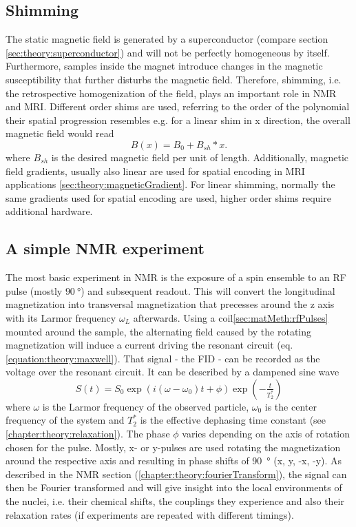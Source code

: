         \subsection{Shimming}
        The static magnetic field is generated by a superconductor (compare section \ref{sec:theory:superconductor}) and will not be perfectly homogeneous by itself. Furthermore, samples inside the magnet introduce changes in the magnetic susceptibility that further disturbs the magnetic field. Therefore, shimming, i.e. the retrospective homogenization of the field, plays an important role in NMR and MRI. Different order shims are used, referring to the order of the polynomial their spatial progression resembles e.g. for a linear shim in x direction, the overall magnetic field would read
            \begin{equation}
                B(x) = B_0 + B_{sh} * x.
            \end{equation}
            where $B_{sh}$ is the desired magnetic field per unit of length.
            Additionally, magnetic field gradients, usually also linear are used for spatial encoding in MRI applications \ref{sec:theory:magneticGradient}. For linear shimming, normally the same gradients used for spatial encoding are used, higher order shims require additional hardware.
        \subsection{A simple NMR experiment}
        The most basic experiment in NMR is the exposure of a spin ensemble to an RF pulse (mostly $\SI{90}{\degree}$) and subsequent readout. This will convert the longitudinal magnetization into transversal magnetization that precesses around the z axis with its Larmor frequency $\omega_L$ afterwards. Using a coil\ref{sec:matMeth:rfPulses} mounted around the sample, the alternating field caused by the rotating magnetization will induce a current driving the resonant circuit (eq. \ref{equation:theory:maxwell}). That signal - the FID - can be recorded as the voltage over the resonant circuit. It can be described by a dampened sine wave
            \begin{equation}
                S(t) = S_0 \exp(i(\omega - \omega_0)  t + \phi) \exp(-\tfrac{t}{T_2^*})
            \end{equation}
            where $\omega$ is the Larmor frequency of the observed particle, $\omega_0$ is the center frequency of the system and $T_2^*$ is the effective dephasing time constant (see \ref{chapter:theory:relaxation}). The phase $\phi$ varies depending on the axis of rotation chosen for the pulse. Mostly, x- or y-pulses are used rotating the magnetization around the respective axis and resulting in phase shifts of \SI{90}{\degree} (x, y, -x, -y). As described in the NMR section (\ref{chapter:theory:fourierTransform}), the signal can then be Fourier transformed and will give insight into the local environments of the nuclei, i.e. their chemical shifts, the couplings they experience and also their relaxation rates (if experiments are repeated with different timings).
